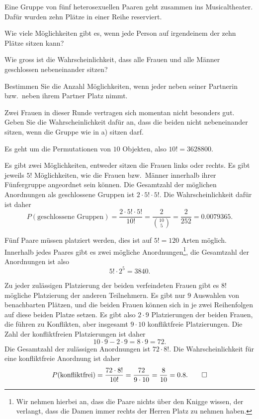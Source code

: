 Eine Gruppe von fünf heterosexuellen Paaren geht zusammen ins Musicaltheater.
Dafür wurden zehn Plätze in einer Reihe reserviert.
\begin{teilaufgaben}
\item
Wie viele Möglichkeiten gibt es, wenn jede Person auf irgendeinem
der zehn Plätze sitzen kann?
\item 
Wie gross ist die Wahrscheinlichkeit, dass alle Frauen und alle Männer
geschlossen nebeneinander sitzen?
\item
Bestimmen Sie die Anzahl Möglichkeiten, wenn jeder neben seiner Partnerin
bzw.~neben ihrem Partner Platz nimmt.
\item
Zwei Frauen in dieser Runde vertragen sich momentan nicht besonders gut.
Geben Sie die Wahrscheinlichkeit dafür an, dass die beiden nicht 
nebeneinander sitzen, wenn die Gruppe wie in a) sitzen
darf.
\end{teilaufgaben}


\begin{loesung}
\begin{teilaufgaben}
\item
Es geht um die Permutationen von $10$ Objekten, also $10!=3628800$.
\item
Es gibt zwei Möglichkeiten, entweder sitzen die Frauen links oder rechts.
Es gibt jeweils $5!$ Möglichkeiten, wie die Frauen bzw.~Männer innerhalb
ihrer Fünfergruppe angeordnet sein können. Die Gesamtzahl der möglichen
Anordnungen als geschlossene Gruppen ist $2\cdot 5!\cdot 5!$.
Die Wahrscheinlichkeit dafür ist daher
\[
P(\text{geschlossene Gruppen})
=
\frac{2\cdot 5!\cdot 5!}{10!}
=
\frac{2}{\binom{10}{5}}
=\frac2{252}=0.0079365.
\]
\item
Fünf Paare müssen platziert werden, dies ist auf $5!=120$ Arten
möglich.
Innerhalb jedes Paares gibt es zwei mögliche Anordnungen\footnote{Wir nehmen
hierbei an, dass die Paare nichts über den Knigge wissen, der verlangt,
dass die Damen immer rechts der Herren Platz zu nehmen haben.}, die
Gesamtzahl der Anordnungen ist also
\[
5!\cdot 2^5=3840.
\]
\item
Zu jeder zulässigen Platzierung der beiden verfeindeten Frauen gibt es
$8!$ mögliche Platzierung der anderen Teilnehmern.
Es gibt nur $9$ Auswahlen von benachbarten Plätzen, und die beiden
Frauen können sich in je zwei Reihenfolgen auf diese beiden Platze
setzen.
Es gibt also $2\cdot 9$ Platzierungen
der beiden Frauen, die führen zu Konflikten,
aber insgesamt $9\cdot 10$ konfliktfreie Platzierungen.
Die Zahl der konfliktfreien Platzierungen ist daher
\[
10\cdot 9-2\cdot 9= 8\cdot 9 = 72.
\]
Die Gesamtzahl der zulässigen Anordnungen ist $72\cdot 8!$.
Die Wahrscheinlichkeit für eine konfliktfreie Anordnung ist daher
\[
P(\text{konfliktfrei}) = \frac{72\cdot 8!}{10!}=\frac{72}{9\cdot 10}
=\frac{8}{10}=0.8.
\qedhere
\]
\end{teilaufgaben}
\end{loesung}

